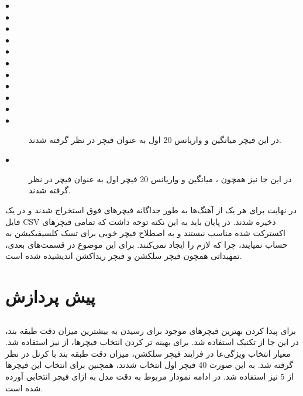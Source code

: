 \begin{description}

    \item[$\bullet$] 
    \item[$\bullet$]  
    \item[$\bullet$] 
    \item[$\bullet$] 
    \item[$\bullet$] 
    \item[$\bullet$] 
    \item[$\bullet$] 
    \item[$\bullet$] 
    \item[$\bullet$]   
    \item[$\bullet$] 
    \item[$\bullet$] 
    در این فیچر میانگین و واریانس 20  اول به عنوان فیچر در نظر گرفته شدند.
    \item[$\bullet$]  
    در این جا نیز همچون ، میانگین و واریانس 20 فیچر اول به عنوان فیچر در نظر گرفته شدند.

\end{description}

در نهایت برای هر یک از آهنگ‌ها به طور جداگانه فیچرهای فوق استخراج شدند و در یک فایل CSV ذخیره شدند.
در پایان باید به این نکته توجه داشت که تمامی فیچرهای اکسترکت شده مناسب نیستند و به اصطلاح فیچر خوبی برای تسک کلسیفیکیشن به حساب نمیایند، چرا که 
 لازم را ایجاد نمی‌کنند. برای این موضوع در قسمت‌های بعدی، تمهیداتی همچون فیچر سلکشن و فیچر ریداکشن اندیشیده شده است.

\section{پیش پردازش}




\subsection{}
برای پیدا کردن بهترین فیچرهای موجود برای رسیدن به بیشترین میزان دقت طبقه بند، در این جا از تکنیک  استفاده شد.
برای بهینه تر کردن انتخاب فیچرها، از  نیز استفاده شد.
معیار انتخاب ویژگی‌عا در فرایند فیچر سلکشن، میزان دقت طبقه بند  با کرنل  در نظر گرفته شد. 
به این صورت 40 فیچر اول انتخاب شدند، همچنین برای انتخاب این فیچرها از 5  نیز استفاده شد.
در ادامه نمودار مربوط به دقت مدل به ازای فیچر انتخابی آورده شده است.

